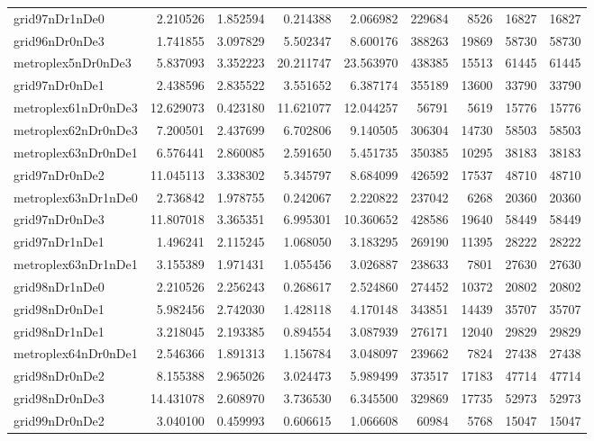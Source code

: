 \documentclass[../../../thesis.tex]{subfiles}
\begin{document}
\begin{longtable}{|l|r|r|r|r|r|r|r|r|}
grid97nDr1nDe0 & 2.210526 & 1.852594 & 0.214388 & 2.066982 & 229684 & 8526 & 16827 & 16827 \\
grid96nDr0nDe3 & 1.741855 & 3.097829 & 5.502347 & 8.600176 & 388263 & 19869 & 58730 & 58730 \\
metroplex5nDr0nDe3 & 5.837093 & 3.352223 & 20.211747 & 23.563970 & 438385 & 15513 & 61445 & 61445 \\
grid97nDr0nDe1 & 2.438596 & 2.835522 & 3.551652 & 6.387174 & 355189 & 13600 & 33790 & 33790 \\
metroplex61nDr0nDe3 & 12.629073 & 0.423180 & 11.621077 & 12.044257 & 56791 & 5619 & 15776 & 15776 \\
metroplex62nDr0nDe3 & 7.200501 & 2.437699 & 6.702806 & 9.140505 & 306304 & 14730 & 58503 & 58503 \\
metroplex63nDr0nDe1 & 6.576441 & 2.860085 & 2.591650 & 5.451735 & 350385 & 10295 & 38183 & 38183 \\
grid97nDr0nDe2 & 11.045113 & 3.338302 & 5.345797 & 8.684099 & 426592 & 17537 & 48710 & 48710 \\
metroplex63nDr1nDe0 & 2.736842 & 1.978755 & 0.242067 & 2.220822 & 237042 & 6268 & 20360 & 20360 \\
grid97nDr0nDe3 & 11.807018 & 3.365351 & 6.995301 & 10.360652 & 428586 & 19640 & 58449 & 58449 \\
grid97nDr1nDe1 & 1.496241 & 2.115245 & 1.068050 & 3.183295 & 269190 & 11395 & 28222 & 28222 \\
metroplex63nDr1nDe1 & 3.155389 & 1.971431 & 1.055456 & 3.026887 & 238633 & 7801 & 27630 & 27630 \\
grid98nDr1nDe0 & 2.210526 & 2.256243 & 0.268617 & 2.524860 & 274452 & 10372 & 20802 & 20802 \\
grid98nDr0nDe1 & 5.982456 & 2.742030 & 1.428118 & 4.170148 & 343851 & 14439 & 35707 & 35707 \\
grid98nDr1nDe1 & 3.218045 & 2.193385 & 0.894554 & 3.087939 & 276171 & 12040 & 29829 & 29829 \\
metroplex64nDr0nDe1 & 2.546366 & 1.891313 & 1.156784 & 3.048097 & 239662 & 7824 & 27438 & 27438 \\
grid98nDr0nDe2 & 8.155388 & 2.965026 & 3.024473 & 5.989499 & 373517 & 17183 & 47714 & 47714 \\
grid98nDr0nDe3 & 14.431078 & 2.608970 & 3.736530 & 6.345500 & 329869 & 17735 & 52973 & 52973 \\
grid99nDr0nDe2 & 3.040100 & 0.459993 & 0.606615 & 1.066608 & 60984 & 5768 & 15047 & 15047 \\

\end{longtable}
\end{document}
